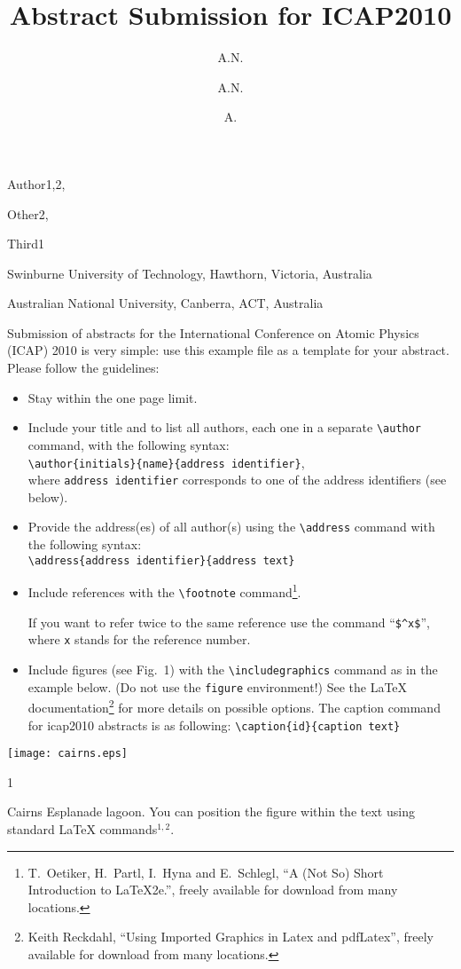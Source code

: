 \documentclass[10pt]{article}
\begin{document}

\title{Abstract Submission for ICAP2010}

\begin{authors}
  \author{A.N.}{Author}{1,2},
  \author{A.N.}{Other}{2},
  \author{A.}{Third}{1}
\end{authors}

\address{1}{Swinburne University of Technology, Hawthorn, Victoria, Australia}
\address{2}{Australian National University, Canberra, ACT, Australia}


\begintext
Submission of abstracts for the International Conference on Atomic
Physics (ICAP) 2010 is very simple: use this example file as a
template for your abstract. Please follow the guidelines:

\begin{itemize}

\item Stay within the one page limit.

\item Include your title and to list all authors, each one in a
  separate \verb+\author+ command, with the following syntax:\\
  \verb+\author{initials}{name}{address identifier}+,\\
  where \verb+address identifier+ corresponds to one of the address
  identifiers (see below).

\item Provide the address(es) of all author(s) using the
  \verb+\address+ command with the following syntax:\\
  \verb+\address{address identifier}{address text}+

\item Include references with the \verb+\footnote+
  command\footnote{T.~Oetiker, H.~Partl, I.~Hyna and E.~Schlegl,
    ``A (Not So) Short Introduction to LaTeX2e.'',
    freely available for download from many locations.
    }.

  If you want to refer twice to the same reference use the command
  ``\verb+$^x$+'', where \verb+x+ stands for the reference number.

\item Include figures (see Fig.~1) with the \verb+\includegraphics+
  command as in the example below. (Do not use the \verb+figure+
  environment!)  See the {\LaTeX} documentation\footnote{Keith Reckdahl,
    ``Using Imported Graphics in Latex and pdfLatex'',
    freely available for download from many locations.}  for more details on possible
  options. The caption command for icap2010 abstracts is
  as following: \verb+\caption{id}{caption text}+
\end{itemize}
\begin{center}
  \texttt{[image: cairns.eps]}
\end{center}

\caption{1}{Cairns Esplanade lagoon. You can position
  the figure within the text using standard {\LaTeX}
  commands$^{1,2}$.}

\end{document}
